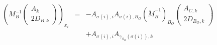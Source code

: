 \documentclass[a4paper]{article}
\begin{document}
\begin{enumerate}
\begin{eqnarray}
\label{eq:r1_i_B_S_k_N_O}
\left(M_{B}^{-1}
           \left(\begin{array}{c}
                   A_{k} \\
	           \hline
	           2D_{B, k}
	         \end{array}
           \right)
\right)_{x_{i}}
&=&
-A_{\sigma(i),i}A_{\sigma(i), B_{O}}\left(\check{M}_{B}^{-1}\right)_{B_{O}}
\left(\begin{array}{c}
        A_{C,k} \\
	\hline
	2D_{B_{O},k}
       \end{array}
\right)
\nonumber \\
&&
+A_{\sigma(i), i}A_{\gamma_{S_{B}}(\sigma(i)), k}
\end{eqnarray}
\end{enumerate}
\end{document}
